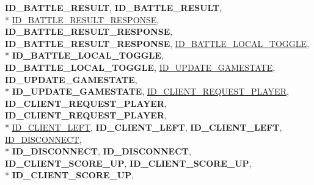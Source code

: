 \begin{DoxyCompactItemize}
{\bfseries I\-D\-\_\-\-B\-A\-T\-T\-L\-E\-\_\-\-R\-E\-S\-U\-L\-T}, 
{\bfseries I\-D\-\_\-\-B\-A\-T\-T\-L\-E\-\_\-\-R\-E\-S\-U\-L\-T}, 
\\*
\hyperlink{namespace_champ_net_plugin_a2ade5cfa7cf6c25ab7236c6b54a57821a0400430dae2bfdb56c3c5be84d5fc2b1}{I\-D\-\_\-\-B\-A\-T\-T\-L\-E\-\_\-\-R\-E\-S\-U\-L\-T\-\_\-\-R\-E\-S\-P\-O\-N\-S\-E}, 
{\bfseries I\-D\-\_\-\-B\-A\-T\-T\-L\-E\-\_\-\-R\-E\-S\-U\-L\-T\-\_\-\-R\-E\-S\-P\-O\-N\-S\-E}, 
{\bfseries I\-D\-\_\-\-B\-A\-T\-T\-L\-E\-\_\-\-R\-E\-S\-U\-L\-T\-\_\-\-R\-E\-S\-P\-O\-N\-S\-E}, 
\hyperlink{namespace_champ_net_plugin_a2ade5cfa7cf6c25ab7236c6b54a57821a01d87e1852357f746b5c583c76db4e23}{I\-D\-\_\-\-B\-A\-T\-T\-L\-E\-\_\-\-L\-O\-C\-A\-L\-\_\-\-T\-O\-G\-G\-L\-E}, 
\\*
{\bfseries I\-D\-\_\-\-B\-A\-T\-T\-L\-E\-\_\-\-L\-O\-C\-A\-L\-\_\-\-T\-O\-G\-G\-L\-E}, 
{\bfseries I\-D\-\_\-\-B\-A\-T\-T\-L\-E\-\_\-\-L\-O\-C\-A\-L\-\_\-\-T\-O\-G\-G\-L\-E}, 
\hyperlink{namespace_champ_net_plugin_a2ade5cfa7cf6c25ab7236c6b54a57821a6c390584862af2434c946e375365fe02}{I\-D\-\_\-\-U\-P\-D\-A\-T\-E\-\_\-\-G\-A\-M\-E\-S\-T\-A\-T\-E}, 
{\bfseries I\-D\-\_\-\-U\-P\-D\-A\-T\-E\-\_\-\-G\-A\-M\-E\-S\-T\-A\-T\-E}, 
\\*
{\bfseries I\-D\-\_\-\-U\-P\-D\-A\-T\-E\-\_\-\-G\-A\-M\-E\-S\-T\-A\-T\-E}, 
\hyperlink{namespace_champ_net_plugin_a2ade5cfa7cf6c25ab7236c6b54a57821a95ea635e1f4775e77d635b7039a9711e}{I\-D\-\_\-\-C\-L\-I\-E\-N\-T\-\_\-\-R\-E\-Q\-U\-E\-S\-T\-\_\-\-P\-L\-A\-Y\-E\-R}, 
{\bfseries I\-D\-\_\-\-C\-L\-I\-E\-N\-T\-\_\-\-R\-E\-Q\-U\-E\-S\-T\-\_\-\-P\-L\-A\-Y\-E\-R}, 
{\bfseries I\-D\-\_\-\-C\-L\-I\-E\-N\-T\-\_\-\-R\-E\-Q\-U\-E\-S\-T\-\_\-\-P\-L\-A\-Y\-E\-R}, 
\\*
\hyperlink{namespace_champ_net_plugin_a2ade5cfa7cf6c25ab7236c6b54a57821a170a6a655b34086567c4039a8e9ba81d}{I\-D\-\_\-\-C\-L\-I\-E\-N\-T\-\_\-\-L\-E\-F\-T}, 
{\bfseries I\-D\-\_\-\-C\-L\-I\-E\-N\-T\-\_\-\-L\-E\-F\-T}, 
{\bfseries I\-D\-\_\-\-C\-L\-I\-E\-N\-T\-\_\-\-L\-E\-F\-T}, 
\hyperlink{namespace_champ_net_plugin_a2ade5cfa7cf6c25ab7236c6b54a57821ab64ca706dd3c8029ea9dc9a239237e15}{I\-D\-\_\-\-D\-I\-S\-C\-O\-N\-N\-E\-C\-T}, 
\\*
{\bfseries I\-D\-\_\-\-D\-I\-S\-C\-O\-N\-N\-E\-C\-T}, 
{\bfseries I\-D\-\_\-\-D\-I\-S\-C\-O\-N\-N\-E\-C\-T}, 
{\bfseries I\-D\-\_\-\-C\-L\-I\-E\-N\-T\-\_\-\-S\-C\-O\-R\-E\-\_\-\-U\-P}, 
{\bfseries I\-D\-\_\-\-C\-L\-I\-E\-N\-T\-\_\-\-S\-C\-O\-R\-E\-\_\-\-U\-P}, 
\\*
{\bfseries I\-D\-\_\-\-C\-L\-I\-E\-N\-T\-\_\-\-S\-C\-O\-R\-E\-\_\-\-U\-P}, 

\end{DoxyCompactItemize}
